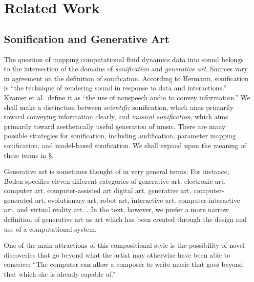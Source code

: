 \chapter[Related Work]{Related Work}
\label{chap:chap2}
\section{Sonification and Generative Art}

The question of mapping computational fluid dynamics data into sound belongs to the intersection of the domains of {\em sonification} and {\em generative art}. Sources vary in agreement on the definition of sonification. According to Hermann, sonification is ``the technique of rendering sound in response to data and interactions.'' \cite{hermann2011sonification} Kramer et al.~define it as ``the use of nonspeech audio to convey information.'' \cite{kramer2010sonification} We shall make a distinction between {\em scientific} sonification, which aims primarily toward conveying information clearly, and {\em musical sonification}, which aims primarily toward aesthetically useful generation of music. There are many possible strategies for sonification, including audification, parameter mapping sonification, and model-based sonification. \cite{hermann2011sonification} We shall expand upon the meaning of these terms in \S\cite{sec:background}.

Generative art is sometimes thought of in very general terms. For instance, Boden specifies eleven different categories of generative art: electronic art, computer art, computer-assisted art digital art, generative art, computer-generated art, evolutionary art, robot art, interactive art, computer-interactive art, and virtual reality art. \cite{boden2009generative}. In the text, however, we prefer a more narrow definition of generative art as art which has been created through the design and use of a computational system.

One of the main attractions of this compositional style is the possibility of novel discoveries that go beyond what the artist may otherwise have been able to conceive: ``The computer can allow a composer to write music that goes beyond that which she is already capable of.'' \cite{roads2015composing}


